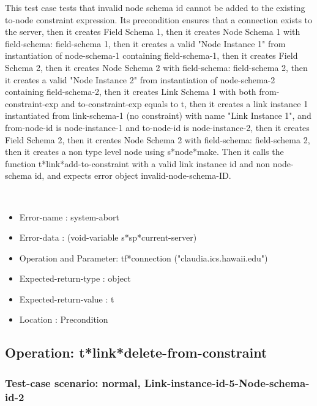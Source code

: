 This test case tests that invalid node schema id cannot be added to the existing to-node constraint expression.
Its precondition ensures that a connection exists to the server, then it creates Field Schema 1, then it creates Node Schema 1 with field-schema: field-schema 1, then it creates a valid "Node Instance 1" from instantiation of node-schema-1 containing field-schema-1, then it creates Field Schema 2, then it creates Node Schema 2 with field-schema: field-schema 2, then it creates a valid "Node Instance 2" from instantiation of node-schema-2 containing field-schema-2, then it creates Link Schema 1 with both from-constraint-exp and to-constraint-exp equals to t, then it creates a link instance 1 instantiated from  link-schema-1 (no constraint) with name "Link Instance 1", and from-node-id is node-instance-1 and to-node-id is node-instance-2, then it creates Field Schema 2, then it creates Node Schema 2 with field-schema: field-schema 2, then it creates a non type level node using s*node*make.
Then it calls the function t*link*add-to-constraint  with a valid link instance id and non node-schema id, and expects error object invalid-node-schema-ID.



\
\begin {itemize}
\item 	Error-name             : system-abort
\item Error-data             : (void-variable s*sp*current-server)
\item Operation and Parameter: tf*connection ("claudia.ics.hawaii.edu")
\item Expected-return-type   : object
\item Expected-return-value  : t
\item Location               : Precondition



\end {itemize}
\subsection {Operation: t*link*delete-from-constraint}
\subsubsection {Test-case scenario: normal, Link-instance-id-5-Node-schema-id-2}


